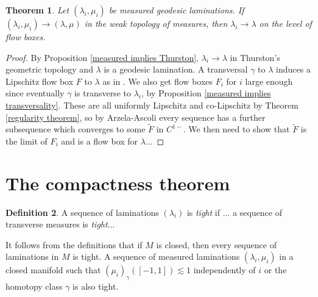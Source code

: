 \documentclass[reqno,10pt]{amsart}
\newcommand{\dfn}[1]{\emph{#1}\index{#1}}
\newtheorem{theorem}{Theorem}[section]
\theoremstyle{definition}
\newtheorem{definition}[theorem]{Definition}
\numberwithin{equation}{section}
\begin{document}
\begin{theorem}
Let $(\lambda_i, \mu_i)$ be measured geodesic laminations.
If $(\lambda_i, \mu_i) \to (\lambda, \mu)$ in the weak topology of measures, then $\lambda_i \to \lambda$ on the level of flow boxes.
\end{theorem}
\begin{proof}
By Proposition \ref{measured implies Thurston}, $\lambda_i \to \lambda$ in Thurston's geometric topology and $\lambda$ is a geodesic lamination.
A transversal $\gamma$ to $\lambda$ induces a Lipschitz flow box $F$ to $\lambda$ as in \cite{daskalopoulos2020transverse}.
We also get flow boxes $F_i$ for $i$ large enough since eventually $\gamma$ is transverse to $\lambda_i$, by Proposition \ref{measured implies transversality}.
These are all uniformly Lipschitz and co-Lipschitz by Theorem \ref{regularity theorem}, so by Arzela-Ascoli every sequence has a further subsequence which converges to some $\tilde F$ in $C^{1-}$.
We then need to show that $\tilde F$ is the limit of $F_i$ and is a flow box for $\lambda$...
\end{proof}

\section{The compactness theorem}
\begin{definition}
A sequence of laminations $(\lambda_i)$ is \dfn{tight} if ... a sequence of transverse measures is \dfn{tight}...
\end{definition}

It follows from the definitions that if $M$ is closed, then every sequence of laminations in $M$ is tight.
A sequence of measured laminations $(\lambda_i, \mu_i)$ in a closed manifold such that $(\mu_i)_\gamma([-1, 1]) \lesssim 1$ independently of $i$ or the homotopy class $\gamma$ is also tight.
\end{document}
